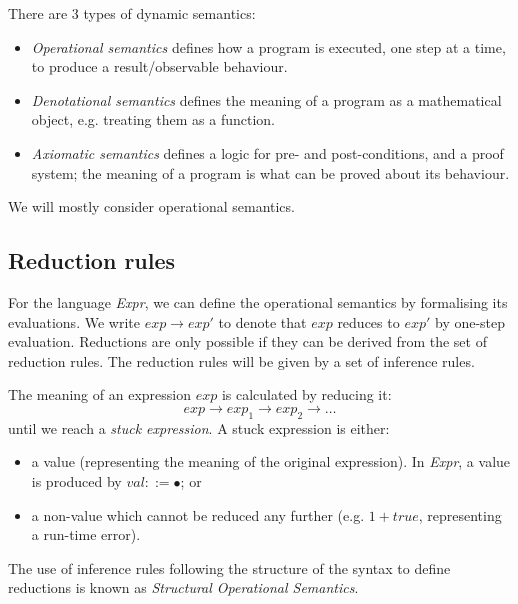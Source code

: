 \documentclass[a4paper, openany]{memoir}
\begin{document}
    There are 3 types of dynamic semantics:
    \begin{itemize}
        \item \emph{Operational semantics} defines how a program is executed, one step at a time, to produce a result/observable behaviour.
        \item \emph{Denotational semantics} defines the meaning of a program as a mathematical object, e.g. treating them as a function.
        \item \emph{Axiomatic semantics} defines a logic for pre- and post-conditions, and a proof system; the meaning of a program is what can be proved about its behaviour.
    \end{itemize}
    We will mostly consider operational semantics.

    \subsection{Reduction rules}
    For the language \textit{Expr}, we can define the operational semantics by formalising its evaluations. We write $exp \to exp'$ to denote that $exp$ reduces to $exp'$ by one-step evaluation. Reductions are only possible if they can be derived from the set of reduction rules. The reduction rules will be given by a set of inference rules.

    The meaning of an expression $exp$ is calculated by reducing it:
    \[exp \to exp_1 \to exp_2 \to \dots\]
    until we reach a \emph{stuck expression}. A stuck expression is either:
    \begin{itemize}
        \item a value (representing the meaning of the original expression). In \textit{Expr}, a value is produced by $val ::= \bullet$; or
        \item a non-value which cannot be reduced any further (e.g. $1 + \textit{true}$, representing a run-time error).
    \end{itemize}
    The use of inference rules following the structure of the syntax to define reductions is known as \emph{Structural Operational Semantics}.
\end{document}
